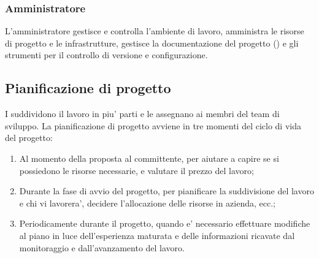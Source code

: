 \subsubsection{Amministratore}
L'amministratore gestisce e controlla l'ambiente di lavoro, amministra le risorse di progetto e le infrastrutture, gestisce la documentazione del progetto () e gli strumenti per il controllo di versione e configurazione.

\subsection{Pianificazione di progetto}
I  suddividono il lavoro in piu' parti e le assegnano ai membri del team di sviluppo. La pianificazione di progetto avviene in tre momenti del ciclo di vida del progetto:
\begin{enumerate}
	\item Al momento della proposta al committente, per aiutare a capire se si possiedono le risorse necessarie, e valutare il prezzo del lavoro;
	\item Durante la fase di avvio del progetto, per pianificare la suddivisione del lavoro e chi vi lavorera', decidere l'allocazione delle risorse in azienda, ecc.;
	\item Periodicamente durante il progetto, quando e' necessario effettuare modifiche al piano in luce dell'esperienza maturata e delle informazioni ricavate dal monitoraggio e dall'avanzamento del lavoro.
\end{enumerate}

